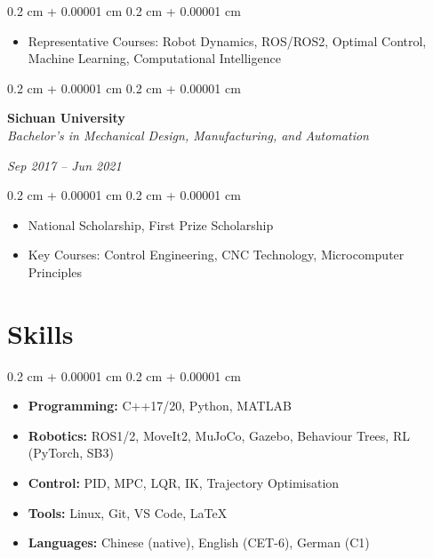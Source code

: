 \documentclass[10pt, letterpaper]{article}
\newenvironment{highlights}{
    \begin{itemize}[
        topsep=0.10 cm,
        parsep=0.10 cm,
        partopsep=0pt,
        itemsep=0pt,
        leftmargin=0.4 cm + 10pt
    ]
}{
    \end{itemize}
}
\newenvironment{onecolentry}{
    \begin{adjustwidth}{
        0.2 cm + 0.00001 cm
    }{
        0.2 cm + 0.00001 cm
    }
}{
    \end{adjustwidth}
}
\newenvironment{twocolentry}[2][]{
    \onecolentry
    \def\secondColumn{#2}
    \setcolumnwidth{\fill, 4.5 cm}
    \begin{paracol}{2}
}{
    \switchcolumn \raggedleft \secondColumn
    \end{paracol}
    \endonecolentry
}
\begin{document}
    \vspace{0.10 cm}
    \begin{onecolentry}
        \begin{highlights}
            \item Representative Courses: Robot Dynamics, ROS/ROS2, Optimal Control, Machine Learning, Computational Intelligence
        \end{highlights}
    \end{onecolentry}

    \vspace{0.2 cm}

    \begin{twocolentry}{\textit{Sep 2017 -- Jun 2021}}
        \textbf{Sichuan University} \\
        \textit{Bachelor's in Mechanical Design, Manufacturing, and Automation}
    \end{twocolentry}

    \vspace{0.10 cm}
    \begin{onecolentry}
        \begin{highlights}
            \item National Scholarship, First Prize Scholarship
            \item Key Courses: Control Engineering, CNC Technology, Microcomputer Principles
        \end{highlights}
    \end{onecolentry}

    \vspace{0.3 cm}

    \section{Skills}

    \begin{onecolentry}
        \begin{highlights}
            \item \textbf{Programming:} C++17/20, Python, MATLAB
            \item \textbf{Robotics:} ROS1/2, MoveIt2, MuJoCo, Gazebo, Behaviour Trees, RL (PyTorch, SB3)
            \item \textbf{Control:} PID, MPC, LQR, IK, Trajectory Optimisation
            \item \textbf{Tools:} Linux, Git, VS Code, LaTeX
            \item \textbf{Languages:} Chinese (native), English (CET-6), German (C1)
        \end{highlights}
    \end{onecolentry}
\end{document}
